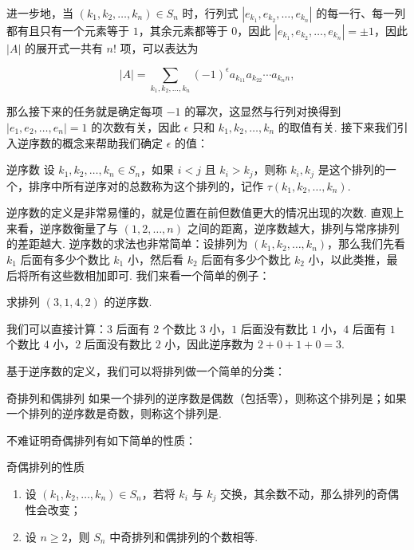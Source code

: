 进一步地，当 $(k_1,k_2,\ldots,k_n) \in S_n$ 时，行列式 $|e_{k_1},e_{k_2},\ldots,e_{k_n}|$ 的每一行、每一列都有且只有一个元素等于 $1$，其余元素都等于 $0$，因此 $|e_{k_1},e_{k_2},\ldots,e_{k_n}| = \pm 1$，因此 $|A|$ 的展开式一共有 $n!$ 项，可以表达为

\[|A| = \sum\limits_{k_1,k_2,\ldots,k_n} (-1)^\epsilon a_{k_11}a_{k_22}\cdots a_{k_nn},\]

那么接下来的任务就是确定每项 $-1$ 的幂次，这显然与行列对换得到 $|e_1,e_2,\ldots,e_n| = 1$ 的次数有关，因此 $\epsilon$ 只和 $k_1,k_2,\ldots,k_n$ 的取值有关. 接下来我们引入逆序数的概念来帮助我们确定 $\epsilon$ 的值：

\begin{definition}{逆序数}{}
    设 $k_1,k_2,\ldots,k_n \in S_n$，如果 $i < j$ 且 $k_i > k_j$，则称 $k_i,k_j$ 是这个排列的一个，排序中所有逆序对的总数称为这个排列的，记作 $\tau(k_1,k_2,\ldots,k_n)$.
\end{definition}

逆序数的定义是非常易懂的，就是位置在前但数值更大的情况出现的次数. 直观上来看，逆序数衡量了与 $(1,2,\ldots,n)$ 之间的距离，逆序数越大，排列与常序排列的差距越大. 逆序数的求法也非常简单：设排列为 $(k_1,k_2,\ldots,k_n)$，那么我们先看 $k_1$ 后面有多少个数比 $k_1$ 小，然后看 $k_2$ 后面有多少个数比 $k_2$ 小，以此类推，最后将所有这些数相加即可. 我们来看一个简单的例子：

\begin{example}{}{}
    求排列 $(3,1,4,2)$ 的逆序数.
\end{example}

\begin{solution}
    我们可以直接计算：$3$ 后面有 $2$ 个数比 $3$ 小，$1$ 后面没有数比 $1$ 小，$4$ 后面有 $1$ 个数比 $4$ 小，$2$ 后面没有数比 $2$ 小，因此逆序数为 $2+0+1+0=3$.
\end{solution}

基于逆序数的定义，我们可以将排列做一个简单的分类：

\begin{definition}{奇排列和偶排列}{}
    如果一个排列的逆序数是偶数（包括零），则称这个排列是；如果一个排列的逆序数是奇数，则称这个排列是.
\end{definition}

不难证明奇偶排列有如下简单的性质：
\begin{example}{奇偶排列的性质}{}
    \begin{enumerate}
        \item 设 $(k_1,k_2,\ldots,k_n) \in S_n$，若将 $k_i$ 与 $k_j$ 交换，其余数不动，那么排列的奇偶性会改变；
        \item 设 $n \geqslant 2$，则 $S_n$ 中奇排列和偶排列的个数相等.
    \end{enumerate}
\end{example}

